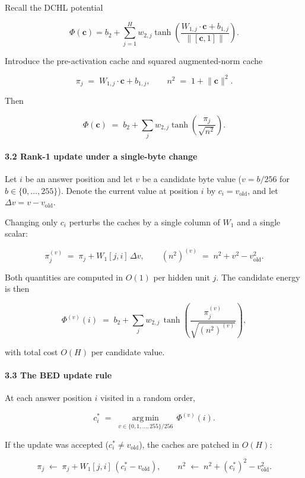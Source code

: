 \documentclass[
  11pt,
  a4paper,
]{article}
\begin{document}
Recall the DCHL potential

\[
\Phi(\mathbf{c}) = b_2 + \sum_{j=1}^H w_{2,j} \tanh\!\left( \frac{W_{1,j} \cdot \mathbf{c} + b_{1,j}}{\lVert [\mathbf{c}, 1] \rVert} \right).
\]

Introduce the pre-activation cache and squared augmented-norm cache

\[
\pi_j \;=\; W_{1,j} \cdot \mathbf{c} + b_{1,j}, \qquad n^2 \;=\; 1 + \lVert \mathbf{c} \rVert^2.
\]

Then

\[
\Phi(\mathbf{c}) \;=\; b_2 + \sum_j w_{2,j} \tanh\!\left( \frac{\pi_j}{\sqrt{n^2}} \right).
\]

\paragraph{3.2 Rank-1 update under a single-byte
change}\label{rank-1-update-under-a-single-byte-change}

Let \(i\) be an answer position and let \(v\) be a candidate byte value
(\(v = b/256\) for \(b \in \{0,\dots,255\}\)). Denote the current value
at position \(i\) by \(c_i = v_{\text{old}}\), and let
\(\Delta v = v - v_{\text{old}}\).

Changing only \(c_i\) perturbs the caches by a single column of \(W_1\)
and a single scalar:

\[
\pi_j^{(v)} \;=\; \pi_j + W_1[j, i] \, \Delta v, \qquad
(n^2)^{(v)} \;=\; n^2 + v^2 - v_{\text{old}}^2.
\]

Both quantities are computed in \(O(1)\) per hidden unit \(j\). The
candidate energy is then

\[
\Phi^{(v)}(i) \;=\; b_2 + \sum_j w_{2,j} \, \tanh\!\left( \frac{\pi_j^{(v)}}{\sqrt{(n^2)^{(v)}}} \right),
\]

with total cost \(O(H)\) per candidate value.

\paragraph{3.3 The BED update rule}\label{the-bed-update-rule}

At each answer position \(i\) visited in a random order,

\[
c_i^{\ast} \;=\; \operatorname*{arg\,min}_{v \in \{0, 1, \dots, 255\}/256}\, \Phi^{(v)}(i).
\]

If the update was accepted (\(c_i^{\ast} \neq v_{\text{old}}\)), the
caches are patched in \(O(H)\):

\[
\pi_j \;\leftarrow\; \pi_j + W_1[j, i] \, (c_i^{\ast} - v_{\text{old}}), \qquad
n^2 \;\leftarrow\; n^2 + (c_i^{\ast})^2 - v_{\text{old}}^2.
\]
\end{document}
